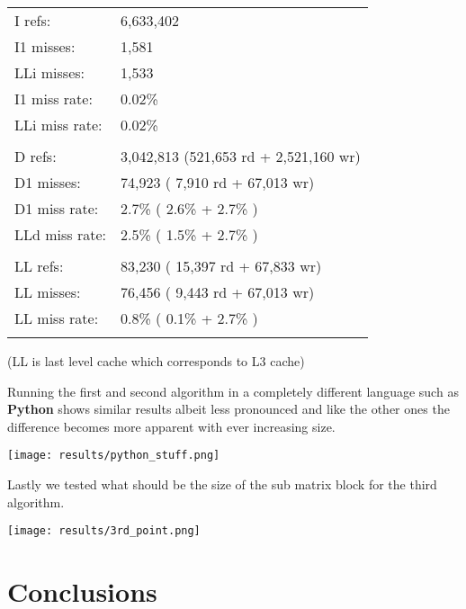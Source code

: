 \documentclass[a4paper]{article}
\begin{document}
\begin{tabular}{ll}

I   refs:  &    6,633,402 \\
I1  misses: &       1,581 \\
LLi misses:  &      1,533 \\
I1  miss rate: &     0.02\% \\
LLi miss rate:  &    0.02\% \\
 &  \\
D   refs:    &  3,042,813  (521,653 rd   + 2,521,160 wr)  \\
D1  misses:   &   74,923  (  7,910 rd   +    67,013 wr) \\
D1  miss rate:  &     2.7\% (    2.6\%     +       2.7\%  ) \\
LLd miss rate:   &    2.5\% (    1.5\%     +       2.7\%  ) \\
  &  \\
LL refs:    &      83,230  ( 15,397 rd   +    67,833 wr) \\
LL misses:   &     76,456  (  9,443 rd   +    67,013 wr) \\
LL miss rate:  &      0.8\% (    0.1\%     +       2.7\%  ) \\
\linebreak 
\linebreak

\end{tabular}

(LL is last level cache which corresponds to L3 cache)

Running the first and second algorithm in a completely different   language such as \textbf{Python} shows similar results albeit less pronounced and like the other ones the difference becomes more apparent with ever increasing size.

\begin{center}
    \texttt{[image: results/python\_stuff.png]}\linebreak
\end{center}


Lastly we tested what should be the size of the sub matrix block for the third algorithm.

\begin{center}
    \texttt{[image: results/3rd\_point.png]}\linebreak
\end{center}

\section{Conclusions}
\end{document}
